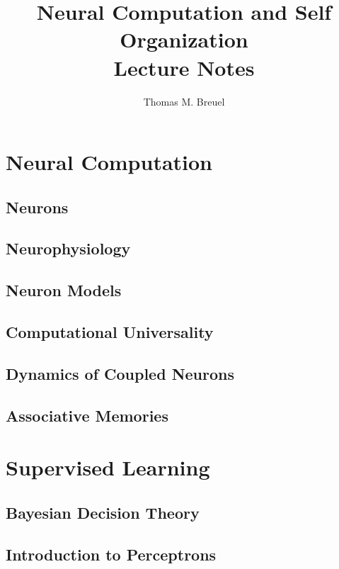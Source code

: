 \documentclass{book}
\title{Neural Computation and Self Organization \\ Lecture Notes}
\author{Thomas M. Breuel}
\begin{document}
\maketitle
\tableofcontents

\part{Neural Computation}

\chapter{Neurons}


\chapter{Neurophysiology}


\chapter{Neuron Models}


\chapter{Computational Universality}


\chapter{Dynamics of Coupled Neurons}


\chapter{Associative Memories}


\part{Supervised Learning}

\chapter{Bayesian Decision Theory}



\chapter{Introduction to Perceptrons}

\end{document}
